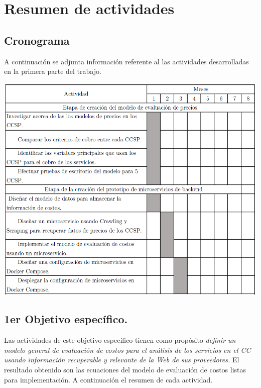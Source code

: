 
\chapter{Resumen de actividades} %

\label{ch:metodologia} %
\section{Cronograma}
A continuación se adjunta información referente al las actividades desarrolladas en la primera parte del trabajo.
\begin{center}
    \includegraphics[width=\textwidth]{gfx/actividades.png}
\end{center}

\section{1er Objetivo específico.}
Las actividades de este objetivo específico tienen como propósito \emph{definir un modelo general de evaluación de costos para el análisis de los servicios en el \acrshort{CC} usando información recuperable y relevante de la Web de sus proveedores.} El resultado obtenido son las ecuaciones del modelo de evaluación de costos listas para implementación. A continuación el resumen de cada actividad.

